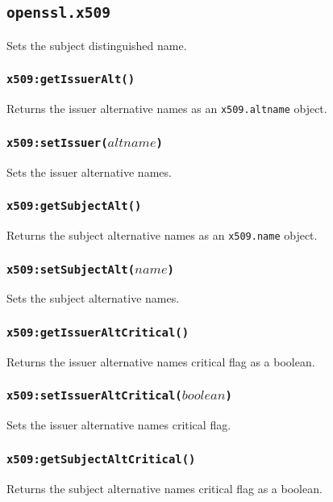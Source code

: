 \documentclass[11pt, oneside]{memoir}
\newcommand*{\fn}[1]{\texttt{#1}\xspace}
\newcommand*{\module}[1]{\texttt{#1}\xspace}
\newcounter{toccols}
\newenvironment{Module}[1]{
	\subsection{\texttt{#1}}
	\addtocontents{toc}{
		\protect\begin{multicols}{\value{toccols}}
	}
}{
	\addtocontents{toc}{\protect\end{multicols}}
}
\begin{document}
\begin{Module}{openssl.x509}
Sets the subject distinguished name.

\subsubsection[\fn{x509:getIssuerAlt}]{\fn{x509:getIssuerAlt()}}

Returns the issuer alternative names as an \module{x509.altname} object.

\subsubsection[\fn{x509:setIssuerAlt}]{\fn{x509:setIssuer($altname$)}}

Sets the issuer alternative names.

\subsubsection[\fn{x509:getSubjectAlt}]{\fn{x509:getSubjectAlt()}}

Returns the subject alternative names as an \module{x509.name} object.

\subsubsection[\fn{x509:setSubjectAlt}]{\fn{x509:setSubjectAlt($name$)}}

Sets the subject alternative names.

\subsubsection[\fn{x509:getIssuerAltCritical}]{\fn{x509:getIssuerAltCritical()}}

Returns the issuer alternative names critical flag as a boolean.

\subsubsection[\fn{x509:setIssuerAltCritical}]{\fn{x509:setIssuerAltCritical($boolean$)}}

Sets the issuer alternative names critical flag.

\subsubsection[\fn{x509:getSubjectAltCritical}]{\fn{x509:getSubjectAltCritical()}}

Returns the subject alternative names critical flag as a boolean.


\end{Module}
\end{document}
